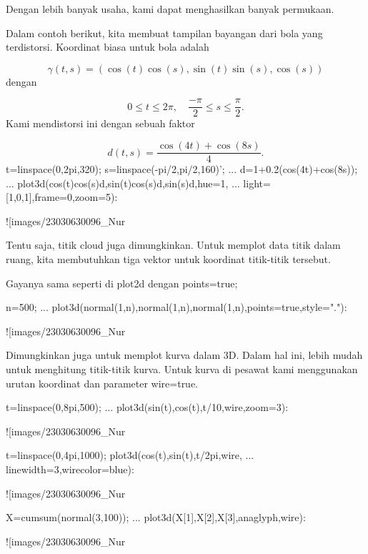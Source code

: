 \documentclass{article}
\begin{document}
Dengan lebih banyak usaha, kami dapat menghasilkan banyak permukaan.


Dalam contoh berikut, kita membuat tampilan bayangan dari bola yang
terdistorsi. Koordinat biasa untuk bola adalah


$$\gamma(t,s) = (\cos(t)\cos(s),\sin(t)\sin(s),\cos(s))$$dengan


$$0 \le t \le 2\pi, \quad \frac{-\pi}{2} \le s \le \frac{\pi}{2}.$$Kami mendistorsi ini dengan sebuah faktor


$$d(t,s) = \frac{\cos(4t)+\cos(8s)}{4}.$$\>t=linspace(0,2pi,320); s=linspace(-pi/2,pi/2,160)'; ...  
\>   d=1+0.2\*(cos(4\*t)+cos(8\*s)); ...  
\>   plot3d(cos(t)\*cos(s)\*d,sin(t)\*cos(s)\*d,sin(s)\*d,hue=1, ...  
\>     light=[1,0,1],frame=0,zoom=5):


![images/23030630096_Nur%

Tentu saja, titik cloud juga dimungkinkan. Untuk memplot data titik
dalam ruang, kita membutuhkan tiga vektor untuk koordinat titik-titik
tersebut.


Gayanya sama seperti di plot2d dengan points=true;


\>n=500;  ...  
\>     plot3d(normal(1,n),normal(1,n),normal(1,n),points=true,style="."):


![images/23030630096_Nur%

Dimungkinkan juga untuk memplot kurva dalam 3D. Dalam hal ini, lebih
mudah untuk menghitung titik-titik kurva. Untuk kurva di pesawat kami
menggunakan urutan koordinat dan parameter wire=true.


\>t=linspace(0,8pi,500); ...  
\>   plot3d(sin(t),cos(t),t/10,\>wire,zoom=3):


![images/23030630096_Nur%

\>t=linspace(0,4pi,1000); plot3d(cos(t),sin(t),t/2pi,\>wire, ...  
\>   linewidth=3,wirecolor=blue):


![images/23030630096_Nur%

\>X=cumsum(normal(3,100)); ...  
\>    plot3d(X[1],X[2],X[3],\>anaglyph,\>wire):


![images/23030630096_Nur%
\end{document}
